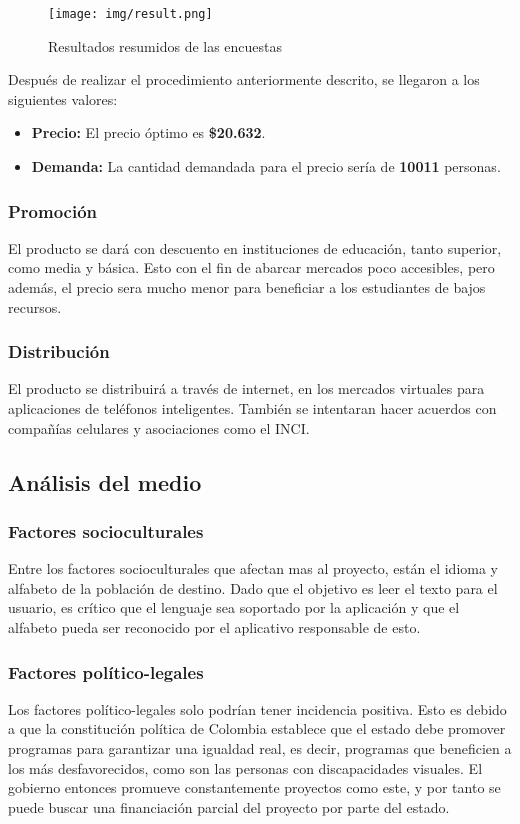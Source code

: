 \documentclass[a4paper, 12pt, oneside]{article}
\begin{document}
	\begin{figure}[htb]
	\begin{center}
	\leavevmode
	\texttt{[image: img/result.png]}
	\end{center}
	\caption{Resultados resumidos de las encuestas}
	\label{fig:result}
	\end{figure}
	
	Después de realizar el procedimiento anteriormente descrito, se llegaron a los siguientes valores:
	\begin{itemize}
		\item {\bf Precio:} El precio óptimo es {\bf \$20.632}.
		\item {\bf Demanda:} La cantidad demandada para el precio sería de {\bf 10011} personas.
	\end{itemize}

	\subsubsection{Promoción}
	El producto se dará con descuento en instituciones de educación, tanto superior, como media y básica. Esto con el fin de abarcar mercados poco accesibles, pero además, el precio sera
	mucho menor para beneficiar a los estudiantes de bajos recursos.
	
	\subsubsection{Distribución}
	El producto se distribuirá a través de internet, en los mercados virtuales para aplicaciones de teléfonos inteligentes. También se intentaran hacer acuerdos con compañías celulares y
	asociaciones como el INCI.

	\subsection{Análisis del medio}

	\subsubsection{Factores socioculturales}
	Entre los factores socioculturales que afectan mas al proyecto, están el idioma y alfabeto de la población de destino. Dado que el objetivo es leer el texto para el usuario, es crítico que el lenguaje sea soportado por la aplicación y que el alfabeto pueda ser reconocido por el aplicativo responsable de esto.
	
	\subsubsection{Factores político-legales}
	Los factores político-legales solo podrían tener incidencia positiva. Esto es debido a que la constitución política de Colombia establece que el estado debe promover programas para
	garantizar una igualdad real, es decir, programas que beneficien a los más desfavorecidos, como son las personas con discapacidades visuales. El gobierno entonces promueve
	constantemente proyectos como este, y por tanto se puede buscar una financiación parcial del proyecto por parte del estado.
	
\end{document}
